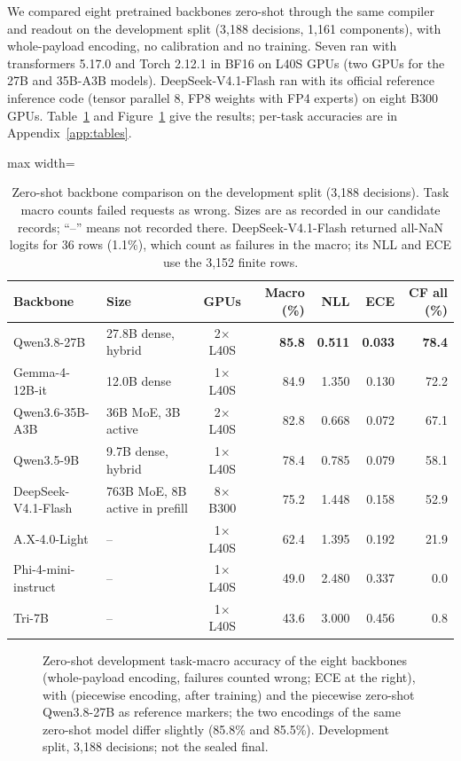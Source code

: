 We compared eight pretrained backbones zero-shot through the same compiler and readout on the
development split (3,188 decisions, 1,161 components), with whole-payload encoding, no
calibration and no training. Seven ran with transformers 5.17.0 and Torch 2.12.1 in BF16 on
L40S GPUs (two GPUs for the 27B and 35B-A3B models). DeepSeek-V4.1-Flash ran with its official
reference inference code (tensor parallel 8, FP8 weights with FP4 experts) on eight B300
GPUs. Table~\ref{tab:leaderboard} and Figure~\ref{fig:leaderboard} give the results; per-task
accuracies are in Appendix~\ref{app:tables}.

\begin{table}[t]
\centering
\small
\caption{Zero-shot backbone comparison on the development split (3,188 decisions). Task
macro counts failed requests as wrong. Sizes are as recorded in our candidate records; ``--''
means not recorded there. DeepSeek-V4.1-Flash returned all-NaN logits for 36 rows
(1.1\%), which count as failures in the macro; its NLL and ECE use the 3,152 finite rows.}
\label{tab:leaderboard}
\setlength{\tabcolsep}{4pt}
\begin{adjustbox}{max width=\linewidth}
\begin{tabular}{@{}llcrrrr@{}}
\toprule
Backbone & Size & GPUs & Macro (\%) & NLL & ECE & CF all (\%) \\
\midrule
Qwen3.8-27B & 27.8B dense, hybrid & 2$\times$L40S & \textbf{85.8} & \textbf{0.511} & \textbf{0.033} & \textbf{78.4} \\
Gemma-4-12B-it & 12.0B dense & 1$\times$L40S & 84.9 & 1.350 & 0.130 & 72.2 \\
Qwen3.6-35B-A3B & 36B MoE, 3B active & 2$\times$L40S & 82.8 & 0.668 & 0.072 & 67.1 \\
Qwen3.5-9B & 9.7B dense, hybrid & 1$\times$L40S & 78.4 & 0.785 & 0.079 & 58.1 \\
DeepSeek-V4.1-Flash & 763B MoE, 8B active in prefill & 8$\times$B300 & 75.2 & 1.448 & 0.158 & 52.9 \\
A.X-4.0-Light & -- & 1$\times$L40S & 62.4 & 1.395 & 0.192 & 21.9 \\
Phi-4-mini-instruct & -- & 1$\times$L40S & 49.0 & 2.480 & 0.337 & 0.0 \\
Tri-7B & -- & 1$\times$L40S & 43.6 & 3.000 & 0.456 & 0.8 \\
\bottomrule
\end{tabular}
\end{adjustbox}
\end{table}

\begin{figure}[t]
\centering
{}
\caption{Zero-shot development task-macro accuracy of the eight backbones
(whole-payload encoding, failures counted wrong; ECE at the right), with \expone{} (piecewise
encoding, after training) and the piecewise zero-shot Qwen3.8-27B as reference markers; the
two encodings of the same zero-shot model differ slightly (85.8\% and 85.5\%). Development
split, 3,188 decisions; not the sealed final.}
\label{fig:leaderboard}
\end{figure}

